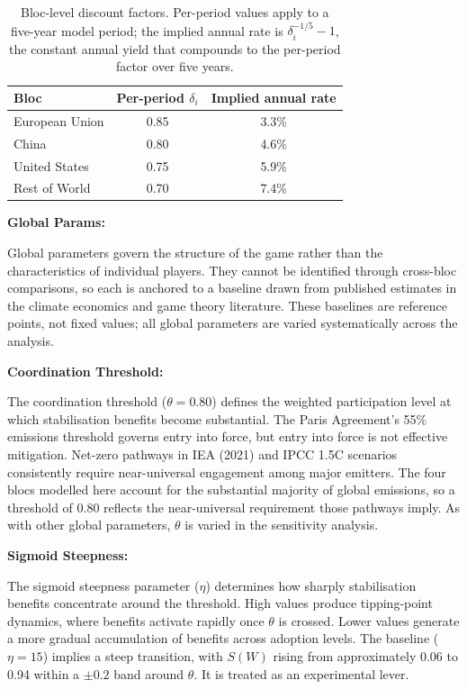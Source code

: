 \documentclass[10pt,a4paper]{article}
\newcommand{\bpar}[1]{%
  \par\addvspace{\medskipamount}%
  \needspace{4\baselineskip}%
  \noindent\textbf{#1}\par\nopagebreak[4]%
}
\begin{document}
\begin{table}[htbp]
\centering
\small
\caption{Bloc-level discount factors. Per-period values apply to a five-year model period; the
implied annual rate is $\delta_i^{-1/5} - 1$, the constant annual yield that compounds to the
per-period factor over five years.}
\label{tab:discount_factors}
\begin{tabular}{lcc}
\toprule
\textbf{Bloc} & \textbf{Per-period $\delta_i$} & \textbf{Implied annual rate} \\
\midrule
European Union   & 0.85 & 3.3\% \\
China            & 0.80 & 4.6\% \\
United States    & 0.75 & 5.9\% \\
Rest of World    & 0.70 & 7.4\% \\
\bottomrule
\end{tabular}
\end{table}

\bpar{Global Params:}
Global parameters govern the structure of the game rather than the characteristics of individual players.
They cannot be identified through cross-bloc comparisons, so each is anchored to a baseline drawn from
published estimates in the climate economics and game theory literature. These baselines are reference points, not fixed values; all global parameters are varied systematically across the analysis.

\bpar{Coordination Threshold:}
The coordination threshold ($\theta = 0.80$) defines the weighted participation level at which stabilisation
benefits become substantial. The Paris Agreement's 55\% emissions threshold governs entry into force, but
entry into force is not effective mitigation. Net-zero pathways in IEA (2021) and IPCC 1.5\textdegree C scenarios
consistently require near-universal engagement among major emitters. The four blocs modelled here
account for the substantial majority of global emissions, so a threshold of 0.80 reflects the near-universal
requirement those pathways imply. As with other global parameters, $\theta$ is varied in the sensitivity analysis.

\bpar{Sigmoid Steepness:}
The sigmoid steepness parameter ($\eta$) determines how sharply stabilisation benefits concentrate around the
threshold. High values produce tipping-point dynamics, where benefits activate rapidly once $\theta$ is
crossed. Lower values generate a more gradual accumulation of benefits across adoption levels. The
baseline ($\eta = 15$) implies a steep transition, with $S(W)$ rising from approximately 0.06 to 0.94 within
a $\pm 0.2$ band around $\theta$. It is treated as an experimental lever.
\end{document}

